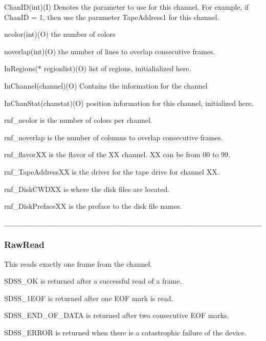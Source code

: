 \begin{arguments}
\item{ChanID}(int)(I) Denotes the parameter to use for this channel.
For example, if ChanID = 1, then use the parameter TapeAddress1 for this
channel.
\item{ncolor}(int)(O) the number of colors
\item{noverlap}(int)(O) the number of lines to overlap consecutive frames.
\item{InRegions}(* regionlist)(O) list of regions, initialialized here.
\item{InChannel}(channel)(O) Contains the information for the channel
\item{InChanStat}(chanstat)(O) position information for this channel,
	initialized here.
\end{arguments}

\begin{params}
\item{rnf\_ncolor} is the number of colors per channel.
\item{rnf\_noverlap} is the number of columns to overlap consecutive frames.
\item{rnf\_flavorXX} is the flavor of the XX channel.  XX can be from 00 to 99.
\item{rnf\_TapeAddressXX} is the driver for the tape drive for channel XX.
\item{rnf\_DiskCWDXX} is where the disk files are located.
\item{rnf\_DiskPrefaceXX} is the preface to the disk file names.
\end{params}


\begin{verbatim}
__________________________________________________________________________
\end{verbatim}

\subsubsection{RawRead}

\begin{descrip}
This reads exactly one frame from the channel.
\end{descrip}

\begin{returnval}
\item{SDSS\_OK} is returned after a successful read of a frame.
\item{SDSS\_1EOF} is returned after one EOF mark is read.
\item{SDSS\_END\_OF\_DATA} is returned after two consecutive EOF marks.
\item{SDSS\_ERROR} is returned when there is a catastrophic failure of the 
device.
\end{returnval}

